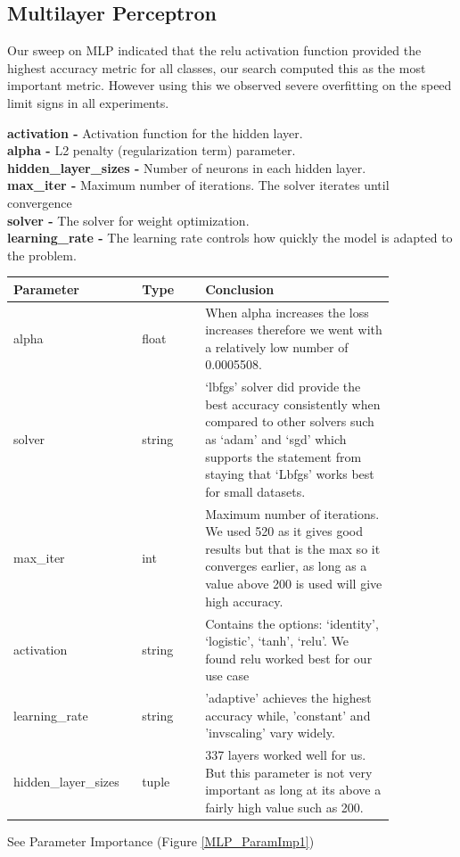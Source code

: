 \documentclass[11pt]{article}
\begin{document}
\newpage
\subsection{Multilayer Perceptron}
\cite{SklearnNeuralNetwork}
\par
\label{MLPSection}
Our sweep on MLP indicated that the relu activation function provided the highest accuracy metric for all classes, our search computed this as the most important metric.
However using this we observed severe overfitting on the speed limit signs in all experiments.

\textbf{activation -} Activation function for the hidden layer. \\
\textbf{alpha -} L2 penalty (regularization term) parameter. \\
\textbf{hidden\_layer\_sizes -} Number of neurons in each hidden layer. \\
\textbf{max\_iter -} Maximum number of iterations. The solver iterates until convergence \\
\textbf{solver -} The solver for weight optimization.\\
\textbf{learning\_rate -} The learning rate controls how quickly the model is adapted to the problem. \\


\begin{table}[ht]
  \centering
  \begin{tabular}{|p{0.25\linewidth} | p{0.15 \linewidth} | p{0.45\linewidth}|} 
    \hline
    \textbf{Parameter} & \textbf{Type} & \textbf{Conclusion} \\ \hline
    alpha & float & When alpha increases the loss increases therefore we went with a relatively low number of 0.0005508. \\ \hline 
    solver & string & ‘lbfgs’ solver did provide the best accuracy consistently when compared to other solvers such as ‘adam’ and ‘sgd’ which supports the statement from \cite{SklearnNeuralNetwork} staying that ‘Lbfgs’ works best for small datasets. \\ \hline
    max\_iter & int & Maximum number of iterations. We used 520 as it gives good results but that is the max so it converges earlier, as long as a value above 200 is used will give high accuracy. \\ \hline
    activation & string & Contains the options: ‘identity’, ‘logistic’, ‘tanh’, ‘relu’. We found relu worked best for our use case  \\ \hline  
    learning\_rate & string & 'adaptive' achieves the highest accuracy while, 'constant' and 'invscaling' vary widely. \\ \hline  
    hidden\_layer\_sizes & tuple & 337 layers worked well for us. But this parameter is not very important as long at its above a fairly high value such as 200. \\ \hline
  \end{tabular}
\end{table}\label{MLP_Analysis_Table}
\FloatBarrier
See Parameter Importance (Figure \ref{MLP_ParamImp1})
\end{document}

